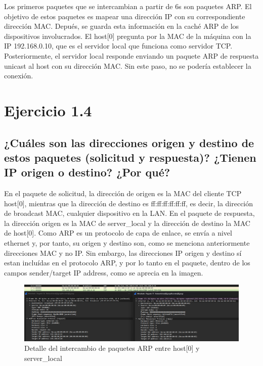 Los primeros paquetes que se intercambian a partir de 6s son paquetes ARP. El objetivo de estos paquetes es mapear una dirección IP con su correspondiente dirección MAC. Depués, se guarda esta información en la caché ARP de los dispositivos involucrados. El host[0] pregunta por la MAC de la máquina con la IP 192.168.0.10, que es el servidor local que funciona como servidor TCP. Posteriormente, el servidor local responde enviando un paquete ARP de respuesta unicast al host con su dirección MAC. Sin este paso, no se podería establecer la conexión.

\section{Ejercicio 1.4}

\subsection{¿Cuáles son las direcciones origen y destino de estos paquetes (solicitud y respuesta)? ¿Tienen IP origen o destino? ¿Por qué?}

En el paquete de solicitud, la dirección de origen es la MAC del cliente TCP host[0], mientras que la dirección de destino es ff:ff:ff:ff:ff:ff, es decir, la dirección de broadcast MAC, cualquier dispositivo en la LAN. En el paquete de respuesta, la dirección origen es la MAC de server\_local y la dirección de destino la MAC de host[0]. 
Como ARP es un protocolo de capa de enlace, se envía a nivel ethernet y, por tanto, su origen y destino son, como se menciona anteriormente direcciones MAC y no IP. Sin embargo, las direcciones IP origen y destino sí estan incluídas en el protocolo ARP, y por lo tanto en el paquete, dentro de los campos sender/target IP address, como se aprecia en la imagen.

\begin{figure}[H]
    \centering
    \includegraphics[width=135mm, scale=0.75]{imaxes/ejercicio1_4.png}
    \caption{Detalle del intercambio de paquetes ARP entre host[0] y server\_local}
    \label{fig:ARP_host0}
\end{figure}


